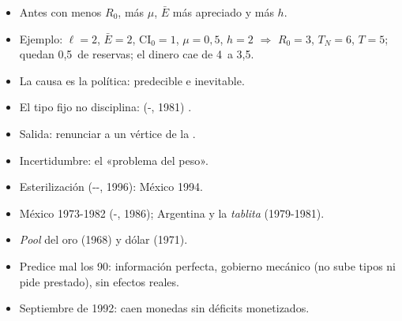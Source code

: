 \documentclass{article}
\begin{document}
\begin{columnas}
\begin{itemize}
\begin{itemize}
  \item Antes con menos $R_0$, más $\mu$, $\bar E$ más apreciado y más $h$.
  \item Ejemplo: $\ell=2$, $\bar E=2$, $\mathrm{CI}_0=1$, $\mu=0{,}5$, $h=2$ $\Rightarrow$ $R_0=3$, $T_N=6$, $T=5$; quedan 0,5~de reservas; el dinero cae de 4~a 3,5.
  \end{itemize}
\end{itemize}
\begin{itemize}
\item La causa es la política: predecible e inevitable.
\item El tipo fijo no disciplina:  (-, 1981) .
\item Salida: renunciar a un vértice de la  .
\end{itemize}
\begin{itemize}
\item Incertidumbre: el «problema del peso».
\item Esterilización (--, 1996): México 1994.
\end{itemize}
\begin{itemize}
\item México 1973-1982 (-, 1986); Argentina y la \emph{tablita} (1979-1981).
\item \emph{Pool} del oro (1968) y dólar (1971).
\end{itemize}
\begin{itemize}
\item Predice mal los 90: información perfecta, gobierno mecánico (no sube tipos ni pide prestado), sin efectos reales.
\item Septiembre de 1992: caen monedas sin déficits monetizados.
\end{itemize}


\end{columnas}
\end{document}
